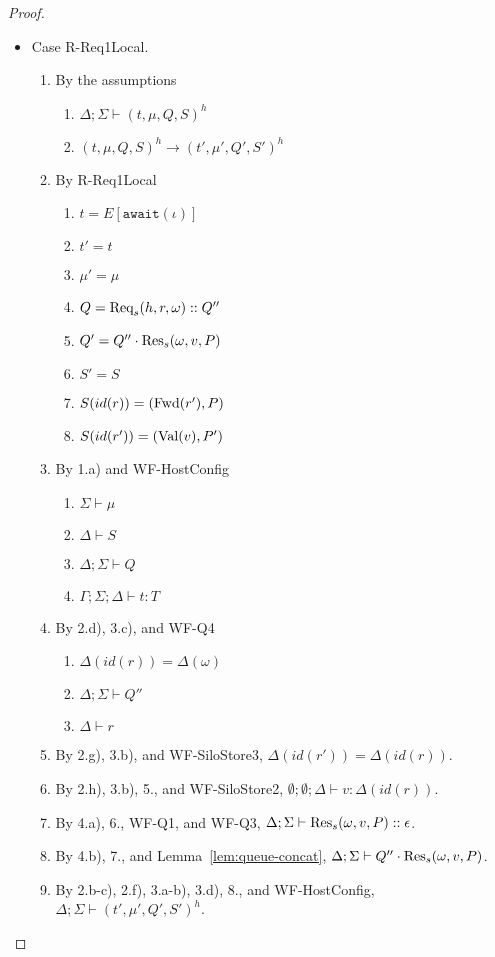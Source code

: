 \begin{proof}
\begin{itemize}
\item Case R-Req1Local.
\begin{enumerate}
\item By the assumptions
  \begin{enumerate}[label=(\alph*)]
  \item $\Delta ; \Sigma \vdash (t, \mu, Q, S)^h$
  \item $(t, \mu, Q, S)^h \longrightarrow (t', \mu', Q', S')^h$
  \end{enumerate}
\item By R-Req1Local
  \begin{enumerate}[label=(\alph*)]
  \item $t = E[\texttt{await}(\iota)]$
  \item $t' = t$
  \item $\mu' = \mu$
  \item $Q = {\textrm{Req}_s(h, r, \omega)} :: Q''$
  \item $Q' = Q'' \cdot {\textrm{Res}_s(\omega, v, P)}$
  \item $S' = S$
  \item $S(id(r))  = (\textrm{Fwd}(r'), P)$  %
  \item $S(id(r')) = (\textrm{Val}(v), P')$
  \end{enumerate}
\item By 1.a) and WF-HostConfig
  \begin{enumerate}[label=(\alph*)]
  \item $\Sigma \vdash \mu$
  \item $\Delta \vdash S$
  \item $\Delta ; \Sigma \vdash Q$
  \item $\Gamma ; \Sigma ; \Delta \vdash t : T$
  \end{enumerate}
\item By 2.d), 3.c), and WF-Q4
  \begin{enumerate}[label=(\alph*)]
  \item $\Delta(id(r)) = \Delta(\omega)$
  \item $\Delta ; \Sigma \vdash Q''$
  \item $\Delta \vdash r$
  \end{enumerate}
\item By 2.g), 3.b), and WF-SiloStore3, $\Delta(id(r')) = \Delta(id(r))$.
\item By 2.h), 3.b), 5., and WF-SiloStore2, $\emptyset ; \emptyset ; \Delta \vdash v : \Delta(id(r))$.
\item By 4.a), 6., WF-Q1, and WF-Q3, $\Delta ; \Sigma \vdash {\textrm{Res}_s(\omega, v, P)} :: \epsilon$.
\item By 4.b), 7., and Lemma~\ref{lem:queue-concat}, $\Delta ; \Sigma \vdash Q'' \cdot {\textrm{Res}_s(\omega, v, P)}$.
\item By 2.b-c), 2.f), 3.a-b), 3.d), 8., and WF-HostConfig, $\Delta ; \Sigma \vdash (t', \mu', Q', S')^h$.
\end{enumerate}


\end{itemize}
\end{proof}
